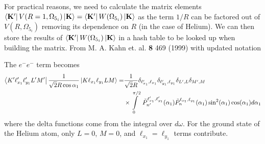 For practical reasons, we need to calculate the matrix elements $\bra{\mathbf{K}'}V(R=1,\Omega_{5_i})\ket{\mathbf{K}} = \bra{\mathbf{K}'}W(\Omega_{5_i})\ket{\mathbf{K}}$ as the term $1/R$ can be factored out of $V(R,\Omega_{5_i})$ removing its dependence on $R$ (in the case of Helium). We can then store the results of $\bra{\mathbf{K}'}W(\Omega_{5_i})\ket{\mathbf{K}}$ in a hash table to be looked up when building the matrix. From M. A. Kahn et. al. \textbf{8} 469 (1999) with updated notation

The $e^-e^-$ term becomes
\begin{align}
    \bra{K'\ell_{x_1}'\ell_{y_1}'L'M'} \frac{1}{\sqrt{2}R\cos\alpha_1} \ket{K \ell_{x_1} \ell_{y_1}LM} =& \frac{1}{\sqrt{2}R} \delta_{\ell_{x_1}',\ell_{x_1}} \delta_{\ell_{y_1}',\ell_{y_1}} \delta_{L',L} \delta_{M',M} \\
    & \times \int\limits_0^{\pi/2}\ \tilde{P}^{\ell_{x_1}',\ell_{y_1}'}_{n'}(\alpha_1) \tilde{P}^{\ell_{x_1},\ell_{y_1}}_{n}(\alpha_1) \sin^2(\alpha_1) \cos(\alpha_1)d\alpha_1  
\end{align}
where the delta functions come from the integral over $d\omega$. For the ground state of the Helium atom, only $L=0$, $M=0$, and $\ell_{x_1}=\ell_{y_1}$ terms contribute.

